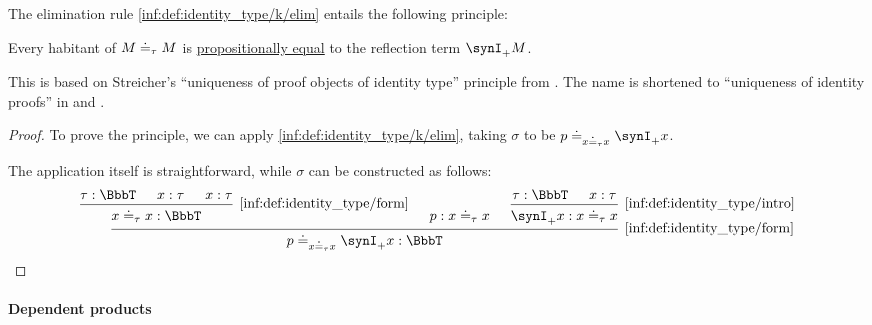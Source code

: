 \begin{theorem}\label{thm:uniqueness_of_identity_proofs}
  The elimination rule \ref{inf:def:identity_type/k/elim} entails the following principle:
  \begin{displayquote}
    Every habitant of \( M \doteq_\tau M \) is \hyperref[def:mltt_propositional_equality]{propositionally equal} to the reflection term \( \synI_+ M \).
  \end{displayquote}
\end{theorem}
\begin{comments}
  \item This is based on Streicher's \enquote{uniqueness of proof objects of identity type} principle from \cite[37; 38]{Streicher1993IntensionalTypeTheory}. The name is shortened to \enquote{uniqueness of identity proofs} in \cite[55]{UnivalentFoundationsProgram2013HoTT} and \cite[\S 9.1.6]{Mimram2020ProgramEqualsProof}.
\end{comments}
\begin{proof}
  To prove the principle, we can apply \ref{inf:def:identity_type/k/elim}, taking \( \sigma \) to be \( p \syneq_{x \syneq_\tau x} \synI_+ x \).

  The application itself is straightforward, while \( \sigma \) can be constructed as follows:
  \begin{equation*}
    \begin{prooftree}
      \hypo{ \tau: \BbbT }
      \hypo{ x: \tau }
      \hypo{ x: \tau }
      \infer3[\ref{inf:def:identity_type/form}]{x \syneq_\tau x: \BbbT}

      \hypo{ p: x \syneq_\tau x }

      \hypo{ \tau: \BbbT }
      \hypo{ x: \tau }
      \infer2[\ref{inf:def:identity_type/intro}]{ \synI_+ x: x \syneq_\tau x }

      \infer3[\ref{inf:def:identity_type/form}]{p \syneq_{x \syneq_\tau x} \synI_+ x: \BbbT}
    \end{prooftree}
  \end{equation*}
\end{proof}

\paragraph{Dependent products}

